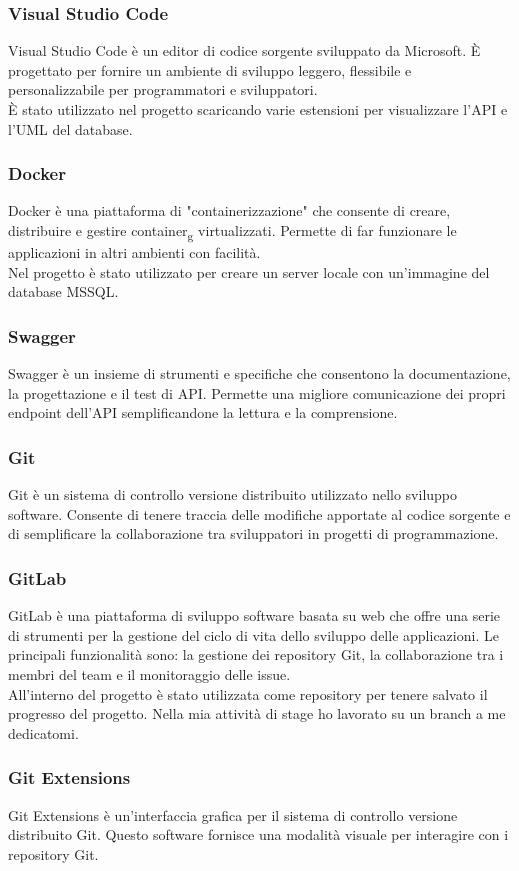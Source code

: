 \subsubsection*{Visual Studio Code}
Visual Studio Code è un editor di codice sorgente sviluppato da Microsoft. È progettato per fornire un ambiente di sviluppo leggero, flessibile e personalizzabile per programmatori e sviluppatori.\\
È stato utilizzato nel progetto scaricando varie estensioni per visualizzare l'API e l'UML del database.\\

\subsubsection*{Docker}
Docker è una piattaforma di "containerizzazione" che consente di creare, distribuire e gestire container\textsubscript{g} virtualizzati. Permette di far funzionare le applicazioni in altri ambienti con facilità.\\
Nel progetto è stato utilizzato per creare un server locale con un'immagine del database MSSQL.\\

\subsubsection*{Swagger}
Swagger è un insieme di strumenti e specifiche che consentono la documentazione, la progettazione e il test di API. Permette una migliore comunicazione dei propri endpoint dell'API semplificandone la lettura e la comprensione.\\

\subsubsection*{Git}
Git è un sistema di controllo versione distribuito utilizzato nello sviluppo software. Consente di tenere traccia delle modifiche apportate al codice sorgente e di semplificare la collaborazione tra sviluppatori in progetti di programmazione.\\


\subsubsection*{GitLab}
GitLab è una piattaforma di sviluppo software basata su web che offre una serie di strumenti per la gestione del ciclo di vita dello sviluppo delle applicazioni. Le principali funzionalità sono: la gestione dei repository Git, la collaborazione tra i membri del team e il monitoraggio delle issue.\\
All'interno del progetto è stato utilizzata come repository per tenere salvato il progresso del progetto. Nella mia attività di stage ho lavorato su un branch a me dedicatomi.\\

\subsubsection*{Git Extensions}
Git Extensions è un'interfaccia grafica per il sistema di controllo versione distribuito Git. Questo software fornisce una modalità visuale per interagire con i repository Git.



